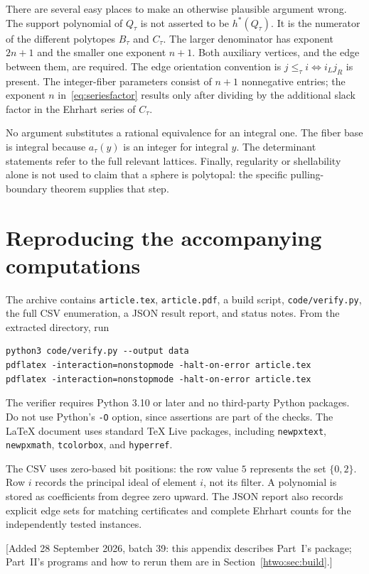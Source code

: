 \documentclass[11pt]{article}
\numberwithin{equation}{section}
\theoremstyle{definition}
\begin{document}
There are several easy places to make an otherwise plausible argument wrong.
The support polynomial of $Q_\tau$ is not asserted to be $h^*(Q_\tau)$.
It is the numerator of the different polytopes $B_\tau$ and $C_\tau$.
The larger denominator has exponent $2n+1$ and the smaller one exponent $n+1$.
Both auxiliary vertices, and the edge between them, are required. The edge
orientation convention is $j\leq_\tau i\iff i_Lj_R$ is present. The
integer-fiber parameters consist of $n+1$ nonnegative entries; the exponent
$n$ in~\eqref{eq:seriesfactor} results only after dividing by the additional
slack factor in the Ehrhart series of $C_\tau$.

No argument substitutes a rational equivalence for an integral one. The
fiber base is integral because $a_\tau(y)$ is an integer for integral $y$.
The determinant statements refer to the full relevant lattices. Finally,
regularity or shellability alone is not used to claim that a sphere is
polytopal: the specific pulling-boundary theorem supplies that step.

\section{Reproducing the accompanying computations}\label{app:reproduce}

The archive contains \texttt{article.tex}, \texttt{article.pdf}, a build script,
\texttt{code/verify.py}, the full CSV enumeration, a JSON result report, and
status notes. From the extracted directory, run
\begin{lstlisting}
python3 code/verify.py --output data
pdflatex -interaction=nonstopmode -halt-on-error article.tex
pdflatex -interaction=nonstopmode -halt-on-error article.tex
\end{lstlisting}
The verifier requires Python 3.10 or later and no third-party Python packages.
Do not use Python's \texttt{-O} option, since assertions are part of the checks.
The LaTeX document uses standard TeX Live packages, including
\texttt{newpxtext}, \texttt{newpxmath}, \texttt{tcolorbox}, and \texttt{hyperref}.

The CSV uses zero-based bit positions: the row value $5$ represents the set
$\{0,2\}$. Row $i$ records the principal ideal of element $i$, not its filter.
A polynomial is stored as coefficients from degree zero upward. The JSON
report also records explicit edge sets for matching certificates and complete
Ehrhart counts for the independently tested instances.

[Added 28 September 2026, batch 39: this appendix describes Part~I's
package; Part~II's programs and how to rerun them are in
Section~\ref{htwo:sec:build}.]
\end{document}
